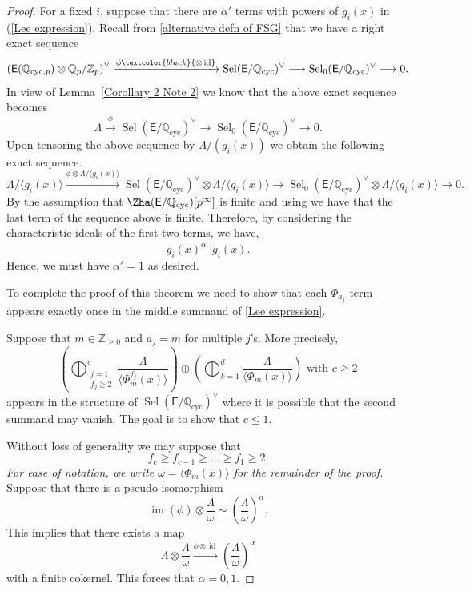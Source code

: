 \documentclass{amsart}
\newcommand{\edit}[1]{\textcolor{black}{#1}}
\numberwithin{equation}{section}
\theoremstyle{remark}
\newcommand{\EC}{\mathsf{E}}
\newcommand{\Qp}{\mathbb{Q}_p}
\newcommand{\Zp}{\mathbb{Z}_p}
\newcommand{\Z}{\mathbb{Z}}
\newcommand{\Q}{\mathbb{Q}}
\newcommand{\cyc}{\operatorname{{cyc}}}
\newcommand{\image}{\operatorname{im}}
\newcommand{\Sel}{\operatorname{Sel}}
\theoremstyle{plain} %
\begin{document}
\begin{proof}
For a fixed $i$, suppose that there are $\alpha'$ terms with powers of $g_i(x)$ in (\ref{Lee expression}).
Recall from \eqref{alternative defn of FSG} that we have a right exact sequence
\[
\left( \EC(\Q_{\cyc,p}) \otimes \Qp/\Zp \right)^{\vee} \xrightarrow{\phi\edit{\otimes \operatorname{id}}} \Sel(\EC/\Q_{\cyc})^\vee \longrightarrow \Sel_0(\EC/\Q_{\cyc})^\vee \longrightarrow 0.
\]
In view of Lemma~\ref{Corollary 2 Note 2} we know that the above exact sequence becomes
\[
\Lambda \xrightarrow{\phi} \Sel(\EC/\Q_{\cyc})^\vee \longrightarrow \Sel_0(\EC/\Q_{\cyc})^\vee \longrightarrow 0.
\]
Upon tensoring the above sequence by $\Lambda/(g_i(x))$ we obtain the following exact sequence.
\[
\Lambda/\langle g_i(x)\rangle \xrightarrow{\phi \otimes \Lambda/\langle g_i(x)\rangle} \Sel(\EC/\Q_{\cyc})^\vee  \otimes \Lambda/\langle g_i(x)\rangle\longrightarrow \Sel_0(\EC/\Q_{\cyc})^\vee   \otimes \Lambda/\langle g_i(x)\rangle\longrightarrow 0.
\]
By the assumption that $\Zha(\EC/\Q_{\cyc})[p^\infty]$ is finite and using \cite[Theorem~C]{Lei23} we have that the last term of the sequence above is finite.
Therefore, by considering the characteristic ideals of the first two terms, we have,
\[
g_i(x)^{\alpha'}|g_i(x).
\]
Hence, we must have $\alpha'=1$ as desired.

To complete the proof of this theorem we need to show that each $\Phi_{a_j}$ term appears exactly once in the middle summand of \eqref{Lee expression}.

Suppose that $m\in \Z_{\geq 0}$ and $a_j=m$ for multiple $j$'s.
More precisely,
\[
\left(\bigoplus_{\substack{j=1\\ f_j\geq 2}}^c \frac{\Lambda}{\langle \Phi_{m}^{f_j}(x) \rangle}\right) \oplus \left(\bigoplus_{k=1}^d \frac{\Lambda}{\langle \Phi_{m}(x) \rangle}\right) \text{ with }c\geq 2
\]
appears in the structure of $\Sel(\EC/\Q_{\cyc})^{\vee}$ where it is possible that the second summand may vanish.
The goal is to show that $c\leq 1$.

Without loss of generality we may suppose that 
\[
f_c \geq f_{c-1} \geq \ldots \geq f_1 \geq 2.
\]
\emph{For ease of notation, we write $\omega = \langle \Phi_{m}(x) \rangle$ for the remainder of the proof.
}Suppose that there is a pseudo-isomorphism
\[
\image(\phi) \otimes \frac{\Lambda}{\omega} \sim \left( \frac{\Lambda}{\omega}\right)^{\alpha}.
\]
This implies that there exists a map
\[
\Lambda \otimes \frac{\Lambda}{\omega} \xrightarrow{\phi \otimes \operatorname{id}} \left( \frac{\Lambda}{\omega}\right)^{\alpha}
\]
with a finite cokernel.
This forces that $\alpha =0,1$.


\end{proof}
\end{document}
